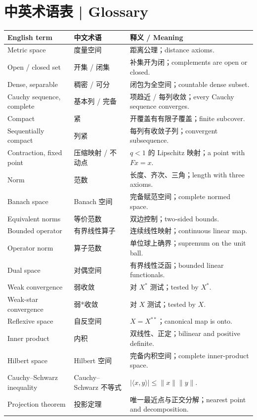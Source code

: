 \documentclass[UTF8,11pt,a4paper]{ctexart}
\begin{document}
\section*{中英术语表 | Glossary}
\begingroup\small
\begin{longtable}{@{}p{3.6cm}p{3.0cm}p{8.8cm}@{}}
\toprule
\textbf{English term} & \textbf{中文术语} & \textbf{释义 / Meaning} \\
\midrule
\endhead
Metric space & 度量空间 & 距离公理；distance axioms. \\
Open / closed set & 开集 / 闭集 & 补集开为闭；complements are open or closed. \\
Dense, separable & 稠密 / 可分 & 闭包为全空间；countable dense subset. \\
Cauchy sequence, complete &基本列 / 完备 & 项趋近 / 每列收敛；every Cauchy sequence converges. \\
Compact & 紧 & 开覆盖有有限子覆盖；finite subcover. \\
Sequentially compact & 列紧 & 每列有收敛子列；convergent subsequence. \\
Contraction, fixed point & 压缩映射 / 不动点 & $q<1$ 的 Lipschitz 映射；a point with $Fx=x$. \\
Norm & 范数 & 长度、齐次、三角；length with three axioms. \\
Banach space & Banach 空间 & 完备赋范空间；complete normed space. \\
Equivalent norms & 等价范数 & 双边控制；two-sided bounds. \\
Bounded operator & 有界线性算子 & 连续线性映射；continuous linear map. \\
Operator norm & 算子范数 & 单位球上确界；supremum on the unit ball. \\
Dual space & 对偶空间 & 有界线性泛函；bounded linear functionals. \\
Weak convergence & 弱收敛 & 对 $X^*$ 测试；tested by $X^*$. \\
Weak-star convergence & 弱*收敛 & 对 $X$ 测试；tested by $X$. \\
Reflexive space & 自反空间 & $X=X^{**}$；canonical map is onto. \\
Inner product & 内积 & 双线性、正定；bilinear and positive definite. \\
Hilbert space & Hilbert 空间 & 完备内积空间；complete inner-product space. \\
Cauchy--Schwarz inequality & Cauchy--Schwarz 不等式 & $|\langle x,y\rangle|\le\|x\|\|y\|$. \\
Projection theorem & 投影定理 & 唯一最近点与正交分解；nearest point and decomposition. \\

\end{longtable}
\end{document}

